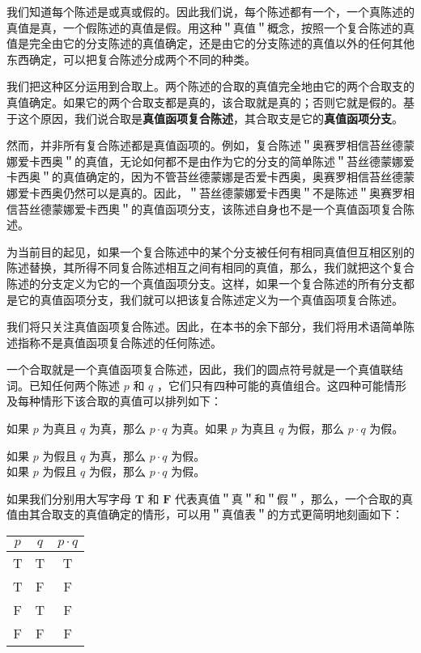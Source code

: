 我们知道每个陈述是或真或假的。因此我们说，每个陈述都有一个，一个真陈述的真值是真，一个假陈述的真值是假。用这种＂真值＂概念，按照一个复合陈述的真值是完全由它的分支陈述的真值确定，还是由它的分支陈述的真值以外的任何其他东西确定，可以把复合陈述分成两个不同的种类。

我们把这种区分运用到合取上。两个陈述的合取的真值完全地由它的两个合取支的真值确定。如果它的两个合取支都是真的，该合取就是真的；否则它就是假的。基于这个原因，我们说合取是\textbf{真值函项复合陈述}，其合取支是它的\textbf{真值函项分支}。

然而，并非所有复合陈述都是真值函项的。例如，复合陈述＂奥赛罗相信苔丝德蒙娜爱卡西奥＂的真值，无论如何都不是由作为它的分支的简单陈述＂苔丝德蒙娜爱卡西奥＂的真值确定的，因为不管苔丝德蒙娜是否爱卡西奥，奥赛罗相信苔丝德蒙娜爱卡西奥仍然可以是真的。因此，＂苔丝德蒙娜爱卡西奧＂不是陈述＂奥赛罗相信苔丝德蒙娜爱卡西奧＂的真值函项分支，该陈述自身也不是一个真值函项复合陈述。

为当前目的起见，如果一个复合陈述中的某个分支被任何有相同真值但互相区别的陈述替换，其所得不同复合陈述相互之间有相同的真值，那么，我们就把这个复合陈述的分支定义为它的一个真值函项分支。这样，如果一个复合陈述的所有分支都是它的真值函项分支，我们就可以把该复合陈述定义为一个真值函项复合陈述。\cite{church1956}

我们将只关注真值函项复合陈述。因此，在本书的余下部分，我们将用术语简单陈述指称不是真值函项复合陈述的任何陈述。

一个合取就是一个真值函项复合陈述，因此，我们的圆点符号就是一个真值联结词。已知任何两个陈述 $p$ 和 $q$ ，它们只有四种可能的真值组合。这四种可能情形及每种情形下该合取的真值可以排列如下：

如果 $p$ 为真且 $q$ 为真，那么 $p \cdot q$ 为真。如果 $p$ 为真且 $q$ 为假，那么 $p \cdot q$ 为假。

如果 $p$ 为假且 $q$ 为真，那么 $p \cdot q$ 为假。\\
如果 $p$ 为假且 $q$ 为假，那么 $p \cdot q$ 为假。

如果我们分别用大写字母 $\mathbf{T}$ 和 $\mathbf{F}$ 代表真值＂真＂和＂假＂，那么，一个合取的真值由其合取支的真值确定的情形，可以用＂真值表＂的方式更简明地刻画如下：

\begin{center}
\begin{tabular}{|ccc|}
\hline
$p$ & $q$ & $p \cdot q$ \\
\hline
T & T & T \\
T & F & F \\
F & T & F \\
F & F & F \\
\hline
\end{tabular}
\end{center}

